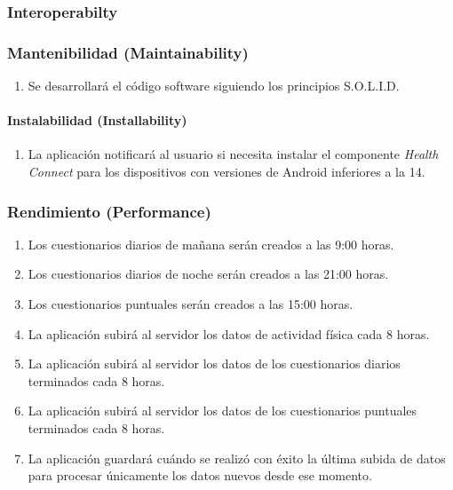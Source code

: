         \subsubsection{Interoperabilty}
        \subsubsection{Mantenibilidad (Maintainability)}
            \begin{enumerate}[resume, label=\textbf{\texttt{RNF-\arabic*}}]
                \item Se desarrollará el código software siguiendo los principios S.O.L.I.D.
            \end{enumerate}
            \paragraph{Instalabilidad (Installability)}
                \begin{enumerate}[resume, label=\textbf{\texttt{RNF-\arabic*}}]
                    \item La aplicación notificará al usuario si necesita instalar el componente \textit{Health Connect} para los dispositivos con versiones de Android inferiores a la 14.
                \end{enumerate}
        \subsubsection{Rendimiento (Performance)}
            \begin{enumerate}[resume, label=\textbf{\texttt{RNF-\arabic*}}]
                \item Los cuestionarios diarios de mañana serán creados a las 9:00 horas.
                \item Los cuestionarios diarios de noche serán creados a las 21:00 horas.
                \item Los cuestionarios puntuales serán creados a las 15:00 horas.
                \item La aplicación subirá al servidor los datos de actividad física cada 8 horas.
                \item La aplicación subirá al servidor los datos de los cuestionarios diarios terminados cada 8 horas.
                \item La aplicación subirá al servidor los datos de los cuestionarios puntuales terminados cada 8 horas.
                \item La aplicación guardará cuándo se realizó con éxito la última subida de datos para procesar únicamente los datos nuevos desde ese momento.
            \end{enumerate}
